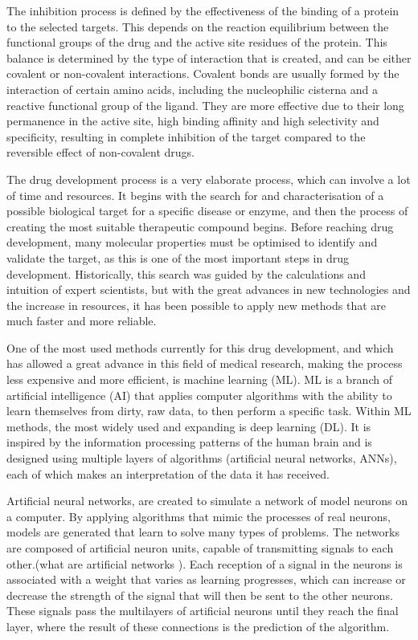 \documentclass[final,times,twocolumn,article]{elsarticle}
\begin{document}
The inhibition process is defined by the effectiveness of the binding of a protein to the selected targets. This depends on the reaction equilibrium between the functional groups of the drug and the active site residues of the protein. This balance is determined by the type of interaction that is created, and can be either covalent or non-covalent interactions. 
Covalent bonds are usually formed by the interaction of certain amino acids, including the nucleophilic cisterna and a reactive functional group of the ligand. They are more effective due to their long permanence in the active site, high binding affinity and high selectivity and specificity, resulting in complete inhibition of the target compared to the reversible effect of non-covalent drugs. \cite{Aljoundi2020} 

The drug development process is a very elaborate process, which can involve a lot of time and resources. It begins with the search for and characterisation of a possible biological target for a specific disease or enzyme, and then the process of creating the most suitable therapeutic compound begins. Before reaching drug development, many molecular properties must be optimised to identify and validate the target, as this is one of the most important steps in drug development. \cite{Hughes2011}
Historically, this search was guided by the calculations and intuition of expert scientists, but with the great advances in new technologies and the increase in resources, it has been possible to apply new methods that are much faster and more reliable. \cite{Hop2018}

One of the most used methods currently for this drug development, and which has allowed a great advance in this field of medical research, making the process less expensive and more efficient, is machine learning (ML). ML is a branch of artificial intelligence (AI) that applies computer algorithms with the ability to learn themselves from dirty, raw data, to then perform a specific task. Within ML methods, the most widely used and expanding is deep learning (DL). It is inspired by the information processing patterns of the human brain and is designed using multiple layers of algorithms (artificial neural networks, ANNs), each of which makes an interpretation of the data it has received. \cite{Alzubaidi2021} 

Artificial neural networks, are created to simulate a network of model neurons on a computer. By applying algorithms that mimic the processes of real neurons, models are generated that learn to solve many types of problems. The networks are composed of artificial neuron units, capable of transmitting signals to each other.(what are artificial networks ). Each reception of a signal in the neurons is associated with a weight that varies as learning progresses, which can increase or decrease the strength of the signal that will then be sent to the other neurons. These signals pass the multilayers of artificial neurons until they reach the final layer, where the result of these connections is the prediction of the algorithm. \cite{Talevi2020}
\end{document}
